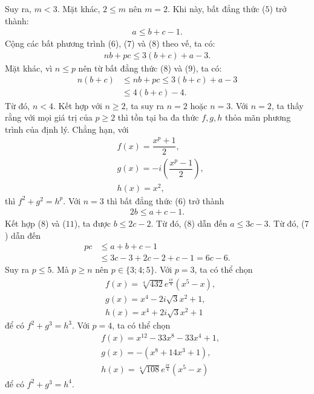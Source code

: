 \begin{multicols}{2}
	Suy ra, $m < 3.$ Mặt khác, $2 \le m$ nên $m = 2.$ Khi này, bất đẳng thức ($5$) trở thành:
	\begin{align*}
		a \le b + c - 1. \tag{$8$} 
	\end{align*}
	Cộng các bất phương trình ($6$), ($7$) và  ($8$) theo vế, ta có:
	\begin{align*}
		nb + pc \le 3(b + c) + a - 3. \tag{$9$}
	\end{align*}
	Mặt khác, vì $n \le p$ nên từ bất đẳng thức ($8$) và ($9$), ta có:
	\begin{align*}
		n(b + c) &\le nb + pc \le 3(b + c) + a - 3 \\
		&\le 4(b + c) - 4. \tag{$10$}
	\end{align*}
	Từ đó, $n < 4$. Kết hợp với $n \ge 2$,  ta suy ra $n = 2$ hoặc $n = 3.$
	\vskip 0.1cm
	Với $n = 2$, ta thấy rằng với mọi giá trị của $p\ge 2$ thì tồn tại ba đa thức $f, g, h$ thỏa mãn phương trình của định lý. Chẳng hạn, với
	\begin{align*}
		&f(x) = \dfrac{x^p+1}{2},\\
		& g(x) = -i\left( \dfrac{x^p-1}{2}\right),\\
		&h(x) = x^2,
	\end{align*}
	thì $f^2+g^2=h^p.$
	\vskip 0.1cm
	Với $n = 3$ thì bất đẳng thức ($6$) trở thành
	\begin{align*}
		2b \le a + c - 1. \tag{$11$}
	\end{align*}
	Kết hợp ($8$) và ($11$), ta được 
	$b \le 2c - 2.$ Từ đó,  ($8$) dẫn đến $a\le 3c - 3.$ Từ đó, ($7$) dẫn đến
	\begin{align*}
		pc &\le a + b + c - 1\\
		&\le 3c - 3 + 2c - 2 + c -1=6c-6.
	\end{align*}
	Suy ra $p \le 5.$ Mà $p\ge n$ nên $p\in \{3;4;5\}.$
	\vskip 0.1cm
	Với $p = 3$, ta có thể chọn
	\begin{align*}
		&f(x) = \sqrt[4]{432}e^{\frac{i\pi}{4}}(x^5-x),\\
		&g(x) = x^4  -2i\sqrt{3}x^2 + 1,\\
		&h(x) = x^4 + 2i\sqrt{3} x^2+ 1
	\end{align*}
	để có $f^2+g^3=h^3.$
	\vskip 0.1cm
	Với $p = 4$, ta có thể chọn 
	\begin{align*}
		&f(x) = x^{12} - 33x^8 - 33x^4 + 1,\\
		&g(x) = -(x^8 + 14x^3 + 1),\\
		&h(x) = \sqrt[4]{108} e^{\frac{i\pi}{4}} (x^5 - x)
	\end{align*}
	để có $f^2+g^3=h^4.$

\end{multicols}
